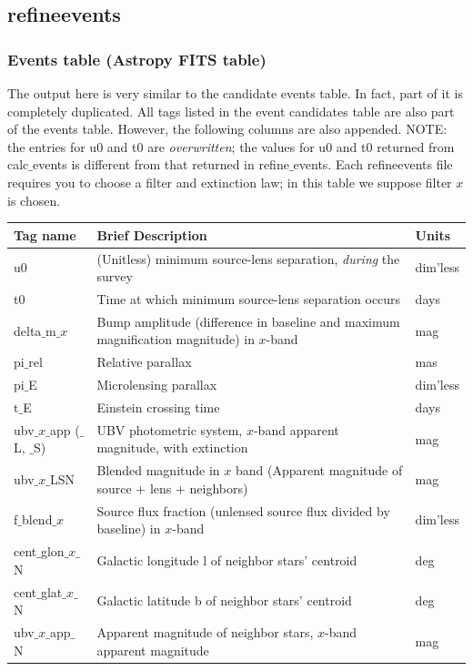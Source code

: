 \documentclass{scrartcl}
\def\tus{\textunderscore}
\begin{document}
\newpage 

\subsection{refine\tus events}

\subsubsection{Events table (Astropy FITS table)}

The output here is very similar to the candidate events table.
In fact, part of it is completely duplicated.
All tags listed in the event candidates table are also part of the events table.
However, the following columns are also appended. 
NOTE: the entries for u0 and t0 are \emph{overwritten}; the values for u0 and t0 returned from calc$\_$events is different from that returned in refine$\_$events.
Each refine\tus events file requires you to choose a filter and extinction law; in this table we suppose filter $x$ is chosen.
\begin{table}[h]
\centering
{}
\begin{tabular}{ l | p{6.5cm} | p{3cm} }
    \textbf{Tag name} & \textbf{Brief Description} & \textbf{Units}  \\
    \hline
    u0 & (Unitless) minimum source-lens separation, \emph{during} the survey & dim'less \\
    t0 & Time at which minimum source-lens separation occurs & days \\
    delta$\_$m$\_x$  & Bump amplitude (difference in baseline and maximum magnification magnitude) in $x$-band & mag \\
    pi$\_$rel & Relative parallax & mas \\
    pi$\_$E & Microlensing parallax & dim'less \\
    t$\_$E & Einstein crossing time & days \\
    ubv$\_x\_$app ($\_$L, $\_$S) & UBV photometric system, $x$-band apparent magnitude, with extinction & mag \\
    ubv$\_x\_$LSN & Blended magnitude in $x$  band (Apparent magnitude of source + lens + neighbors) & mag\\
    f$\_$blend$\_x$  & Source flux fraction (unlensed source flux divided by baseline) in $x$-band & dim'less \\
    cent$\_$glon$\_x\_$N & Galactic longitude l of neighbor stars' centroid & deg \\
    cent$\_$glat$\_x\_$N & Galactic latitude b of neighbor stars' centroid & deg\\
    ubv$\_x\_$app$\_$N &  Apparent magnitude of neighbor stars, $x$-band apparent magnitude & mag\\
\end{tabular}
\end{table}
\end{document}
